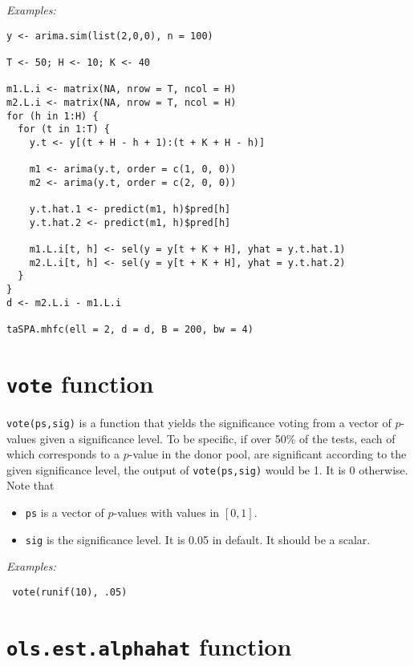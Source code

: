 \documentclass[12pt]{article}
\begin{document}
 \emph{Examples:}
\begin{verbatim}
y <- arima.sim(list(2,0,0), n = 100)

T <- 50; H <- 10; K <- 40

m1.L.i <- matrix(NA, nrow = T, ncol = H)
m2.L.i <- matrix(NA, nrow = T, ncol = H)
for (h in 1:H) {
  for (t in 1:T) {
    y.t <- y[(t + H - h + 1):(t + K + H - h)]
    
    m1 <- arima(y.t, order = c(1, 0, 0))
    m2 <- arima(y.t, order = c(2, 0, 0))
    
    y.t.hat.1 <- predict(m1, h)$pred[h]
    y.t.hat.2 <- predict(m1, h)$pred[h]
    
    m1.L.i[t, h] <- sel(y = y[t + K + H], yhat = y.t.hat.1)
    m2.L.i[t, h] <- sel(y = y[t + K + H], yhat = y.t.hat.2)
  }
}
d <- m2.L.i - m1.L.i

taSPA.mhfc(ell = 2, d = d, B = 200, bw = 4)
\end{verbatim}
 
 
 \section{\texttt{vote} function}
 
 
 \texttt{vote(ps,sig)} is a function that yields the significance voting from a vector of $p$-values given a significance level. To be specific, if over 50\% of the tests, each of which corresponds to a $p$-value in the donor pool,   are significant according to the given significance level, the output of  \texttt{vote(ps,sig)} would be 1. It is 0 otherwise. Note that
 \begin{itemize}
 	\item \texttt{ps} is a vector of $p$-values with values in $[0,1]$.
 	\item \texttt{sig} is the significance level. It is 0.05 in default. It should be a scalar.
 \end{itemize}
 
 \emph{Examples:}
 
 \begin{verbatim}
 vote(runif(10), .05)
 \end{verbatim}
 
 \section{\texttt{ols.est.alphahat} function}
 
\end{document}
